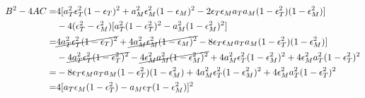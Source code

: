 \begin{align*}
  B^2-4AC=&4[a^2_T\epsilon_T^2(1-\epsilon_T)^2+a^2_M\epsilon_M^2(1-\epsilon_M)^2-2\epsilon_T\epsilon_Ma_Ta_M(1-\epsilon_T^2)(1-\epsilon_M^2)]\nonumber\\
  &-4(\epsilon_T^2-\epsilon_M^2)[a_T^2(1-\epsilon_T^2)^2-a_M^2(1-\epsilon_M^2)^2]\nonumber\\
  =&\cancel{4a^2_T\epsilon_T^2(1-\epsilon_T)^2}+\cancel{4a^2_M\epsilon_M^2(1-\epsilon_M)^2}-8\epsilon_T\epsilon_Ma_Ta_M(1-\epsilon_T^2)(1-\epsilon_M^2)]\nonumber\\
  &-\cancel{4a_T^2\epsilon_T^2(1-\epsilon_T^2)^2}
-\cancel{4\epsilon_M^2a_M^2(1-\epsilon_M^2)^2}
+4a_M^2\epsilon_T^2(1-\epsilon_M^2)^2+4\epsilon_M^2a_T^2(1-\epsilon_T^2)^2\nonumber\\
     =&-8\epsilon_T\epsilon_Ma_Ta_M(1-\epsilon_T^2)(1-\epsilon_M^2)
+4a_M^2\epsilon_T^2(1-\epsilon_M^2)^2+4\epsilon_M^2a_T^2(1-\epsilon_T^2)^2\nonumber\\
=&4[a_T\epsilon_M(1-\epsilon_T^2)-a_M\epsilon_T(1-\epsilon_M^2)]^2
 \end{align*}

